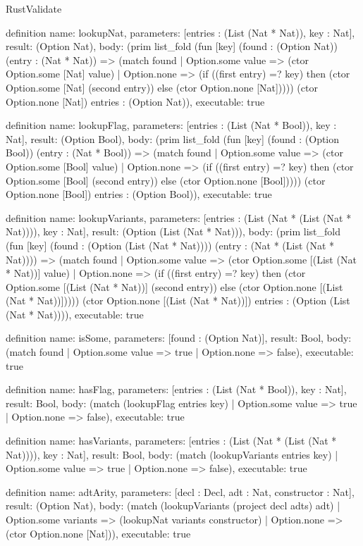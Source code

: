 \begin{lexlean}{RustValidate}
\begin{semanticmodule}
definition{
  name: lookupNat,
  parameters: [entries : (List (Nat * Nat)), key : Nat],
  result: (Option Nat),
  body: (prim list_fold (fun [key] (found : (Option Nat)) (entry : (Nat * Nat)) => (match found
    | Option.some value => (ctor Option.some [Nat] value)
    | Option.none => (if ((first entry) =? key) then (ctor Option.some [Nat] (second entry)) else (ctor Option.none [Nat])))) (ctor Option.none [Nat]) entries : (Option Nat)),
  executable: true
}

definition{
  name: lookupFlag,
  parameters: [entries : (List (Nat * Bool)), key : Nat],
  result: (Option Bool),
  body: (prim list_fold (fun [key] (found : (Option Bool)) (entry : (Nat * Bool)) => (match found
    | Option.some value => (ctor Option.some [Bool] value)
    | Option.none => (if ((first entry) =? key) then (ctor Option.some [Bool] (second entry)) else (ctor Option.none [Bool])))) (ctor Option.none [Bool]) entries : (Option Bool)),
  executable: true
}

definition{
  name: lookupVariants,
  parameters: [entries : (List (Nat * (List (Nat * Nat)))), key : Nat],
  result: (Option (List (Nat * Nat))),
  body: (prim list_fold (fun [key] (found : (Option (List (Nat * Nat)))) (entry : (Nat * (List (Nat * Nat)))) => (match found
    | Option.some value => (ctor Option.some [(List (Nat * Nat))] value)
    | Option.none => (if ((first entry) =? key) then (ctor Option.some [(List (Nat * Nat))] (second entry)) else (ctor Option.none [(List (Nat * Nat))])))) (ctor Option.none [(List (Nat * Nat))]) entries : (Option (List (Nat * Nat)))),
  executable: true
}

definition{
  name: isSome,
  parameters: [found : (Option Nat)],
  result: Bool,
  body: (match found | Option.some value => true | Option.none => false),
  executable: true
}

definition{
  name: hasFlag,
  parameters: [entries : (List (Nat * Bool)), key : Nat],
  result: Bool,
  body: (match (lookupFlag entries key) | Option.some value => true | Option.none => false),
  executable: true
}

definition{
  name: hasVariants,
  parameters: [entries : (List (Nat * (List (Nat * Nat)))), key : Nat],
  result: Bool,
  body: (match (lookupVariants entries key) | Option.some value => true | Option.none => false),
  executable: true
}

definition{
  name: adtArity,
  parameters: [decl : Decl, adt : Nat, constructor : Nat],
  result: (Option Nat),
  body: (match (lookupVariants (project decl adts) adt)
    | Option.some variants => (lookupNat variants constructor)
    | Option.none => (ctor Option.none [Nat])),
  executable: true
}


\end{semanticmodule}
\end{lexlean}
